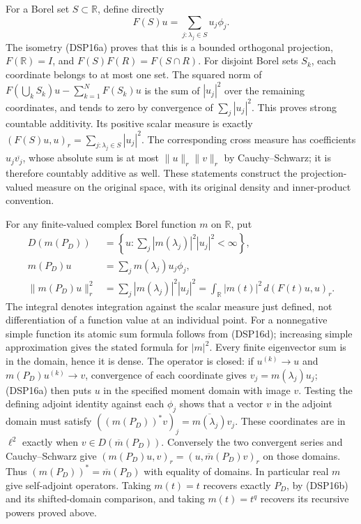 \documentclass[
  11pt,
]{article}
\begin{document}
For a Borel set \(S\subset\mathbb R\), define directly \[
 F(S)u=\sum_{j:\lambda_j\in S}u_j\phi_j.
 \tag{DSP16d}
\] The isometry (DSP16a) proves that this is a bounded orthogonal
projection, \(F(\mathbb R)=I\), and \(F(S)F(R)=F(S\cap R)\). For
disjoint Borel sets \(S_k\), each coordinate belongs to at most one set.
The squared norm of \(F(\bigcup_k S_k)u-\sum_{k=1}^N F(S_k)u\) is the
sum of \(|u_j|^2\) over the remaining coordinates, and tends to zero by
convergence of \(\sum_j|u_j|^2\). This proves strong countable
additivity. Its positive scalar measure is exactly
\((F(S)u,u)_r=\sum_{j:\lambda_j\in S}|u_j|^2\). The corresponding cross
measure has coefficients \(u_j\overline{v_j}\), whose absolute sum is at
most \(\|u\|_r\|v\|_r\) by Cauchy--Schwarz; it is therefore countably
additive as well. These statements construct the projection-valued
measure on the original space, with its original density and
inner-product convention.

For any finite-valued complex Borel function \(m\) on \(\mathbb R\), put
\[
\begin{aligned}
 D(m(P_D))&=\left\{u:\sum_j|m(\lambda_j)|^2|u_j|^2<\infty\right\},\\
 m(P_D)u&=\sum_j m(\lambda_j)u_j\phi_j,\\
 \|m(P_D)u\|_r^2
 &=\sum_j|m(\lambda_j)|^2|u_j|^2
   =\int_{\mathbb R}|m(t)|^2\,d(F(t)u,u)_r.
\end{aligned}
 \tag{DSP16e}
\] The integral denotes integration against the scalar measure just
defined, not differentiation of a function value at an individual point.
For a nonnegative simple function its atomic sum formula follows from
(DSP16d); increasing simple approximation gives the stated formula for
\(|m|^2\). Every finite eigenvector sum is in the domain, hence it is
dense. The operator is closed: if \(u^{(k)}\to u\) and
\(m(P_D)u^{(k)}\to v\), convergence of each coordinate gives
\(v_j=m(\lambda_j)u_j\); (DSP16a) then puts \(u\) in the specified
moment domain with image \(v\). Testing the defining adjoint identity
against each \(\phi_j\) shows that a vector \(v\) in the adjoint domain
must satisfy \(((m(P_D))^*v)_j=\overline{m(\lambda_j)}v_j\). These
coordinates are in \(\ell^2\) exactly when \(v\in D(\overline m(P_D))\).
Conversely the two convergent series and Cauchy--Schwarz give
\((m(P_D)u,v)_r=(u,\overline m(P_D)v)_r\) on those domains. Thus
\((m(P_D))^*=\overline m(P_D)\) with equality of domains. In particular
real \(m\) give self-adjoint operators. Taking \(m(t)=t\) recovers
exactly \(P_D\), by (DSP16b) and its shifted-domain comparison, and
taking \(m(t)=t^q\) recovers its recursive powers proved above.
\end{document}

